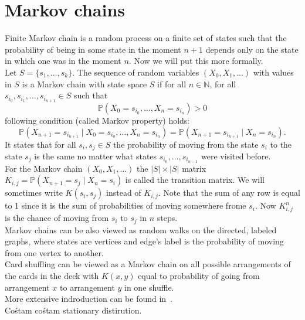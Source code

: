 \documentclass[a4paper, 12pt]{report}
\begin{document}
\chapter{Markov chains}
\setcounter{page}{5}
Finite Markov chain is a random process on a finite set of states such that
the probability of being in some state in the moment $n+1$ depends only on the state in which one was
in the moment $n$. Now we will put this more formally.\\
Let $S = \{s_1, \dots, s_k\}$. The sequence of random variables $(X_0, X_1, \dots)$ with values in $S$
is a Markov chain with state space $S$ if for all $n \in \mathbb{N}$,
for all $s_{i_0}, s_{i_1}, \dots, s_{i_{n+1}} \in S$ such that
\begin{equation*}
\mathbb{P}(X_0 = s_{i_0}, \dots, X_n = s_{i_n}) > 0
\end{equation*}
following condition (called Markov property) holds:
\begin{equation}
\mathbb{P}(X_{n+1} = s_{i_{n+1}} \mid X_0 = s_{i_0}, \dots, X_n = s_{i_n}) =
\mathbb{P}(X_{n+1} = s_{i_{n+1}} \mid X_n = s_{i_n}).
\end{equation}
It states that for all $s_i, s_j \in S$ the probability of moving from the state
$s_i$ to the state $s_j$ is the same no matter what states $s_{i_0}, \dots, s_{i_{n-1}}$
were visited before. \\
For the Markov chain $(X_0, X_1, \dots)$ the $|S| \times |S|$ matrix
$K_{i,j} = \mathbb{P}(X_{n+1} = s_j \mid X_n = s_i)$ is called the transition matrix. We will sometimes
write $K(s_i, s_j)$ instead of $K_{i,j}$. Note that the sum of
any row is equal to 1 since it is the sum of probabilities of moving somewhere frome $s_i$.
Now $K^n_{i,j}$ is the chance of moving from $s_i$ to $s_j$ in $n$ steps. \\
Markov chains can be also viewed as random walks on the directed, labeled graphs, where states are vertices
and edge's label is the probability of moving from one vertex to another. \\
Card shuffling can be viewed as a Markov chain on all possible arrangements of the cards
in the deck with $K(x,y)$ equal to probability of going from arrangement $x$ to arrangement $y$ in one
shuffle.
\\ More extensive indroduction can be found in~\cite{LePeWi}. \\
Cośtam cośtam stationary distirution. \\
\end{document}
